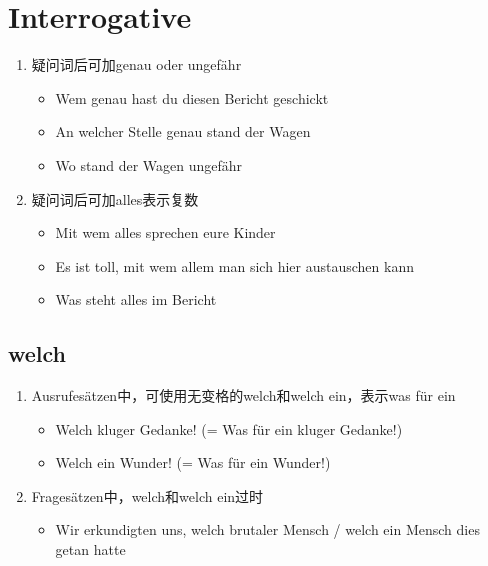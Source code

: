\documentclass[UTF8]{report}
\begin{document}
\section{Interrogative}
\begin{enumerate}
    \item 疑问词后可加genau oder ungefähr
    \begin{itemize}
        \item Wem genau hast du diesen Bericht geschickt
        \item An welcher Stelle genau stand der Wagen
        \item Wo stand der Wagen ungefähr
    \end{itemize}
    \item 疑问词后可加alles表示复数
    \begin{itemize}
        \item Mit wem alles sprechen eure Kinder
        \item Es ist toll, mit wem allem man sich hier austauschen kann
        \item Was steht alles im Bericht
    \end{itemize}
\end{enumerate}

\subsection{welch}
\begin{enumerate}
    \item Ausrufesätzen中，可使用无变格的welch和welch ein，表示was für ein
    \begin{itemize}
        \item Welch kluger Gedanke! (= Was für ein kluger Gedanke!)
        \item Welch ein Wunder! (= Was für ein Wunder!)
    \end{itemize}
    \item Fragesätzen中，welch和welch ein过时
    \begin{itemize}
        \item Wir erkundigten uns, welch brutaler Mensch / welch ein Mensch dies getan hatte
    \end{itemize}
\end{enumerate}
\end{document}

